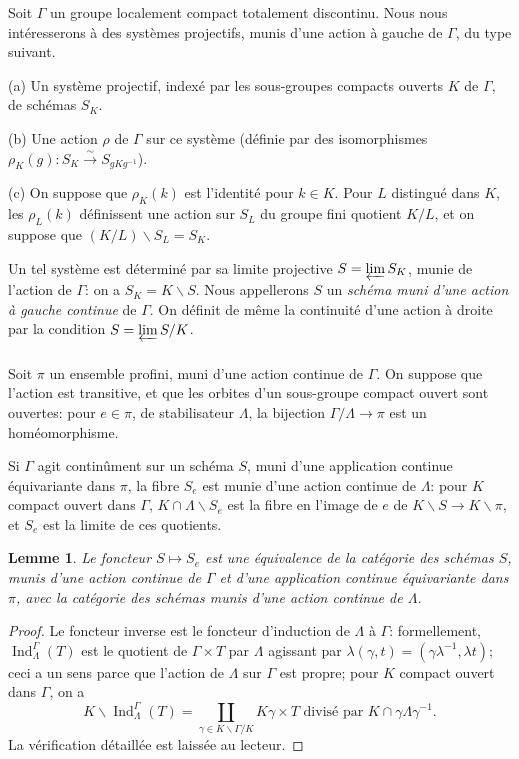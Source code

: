 \documentclass[12pt,a4paper]{article}
\theoremstyle{plain}
\newtheorem{lemma}[theorem]{Lemme}
\theoremstyle{definition}
\theoremstyle{remark}
\DeclareMathOperator{\Ind}{Ind}
\begin{document}
Soit $\Gamma$ un groupe localement compact totalement discontinu. Nous nous int\'eresserons \`a des syst\`emes projectifs, munis d'une action \`a gauche de $\Gamma$, du type suivant.

(a) Un syst\`eme projectif, index\'e par les sous-groupes compacts ouverts $K$ de $\Gamma$, de sch\'emas $S_K$.

(b) Une action $\rho$ de $\Gamma$ sur ce syst\`eme (d\'efinie par des isomorphismes $\rho_K(g): S_K \xrightarrow{\sim} S_{gKg^{-1}}$).

(c) On suppose que $\rho_K(k)$ est l'identit\'e pour $k \in K$. Pour $L$ distingu\'e dans $K$, les $\rho_L(k)$ d\'efinissent une action sur $S_L$ du groupe fini quotient $K/L$, et on suppose que $(K/L)\backslash S_L = S_K$.

Un tel syst\`eme est d\'etermin\'e par sa limite projective $S = \varprojlim S_K$, munie de l'action de $\Gamma$: on a $S_K = K\backslash S$. Nous appellerons $S$ un \textit{sch\'ema muni d'une action \`a gauche continue} de $\Gamma$. On d\'efinit de m\^eme la continuit\'e d'une action \`a droite par la condition $S = \varprojlim S/K$.

\subsubsection{}

Soit $\pi$ un ensemble profini, muni d'une action continue de $\Gamma$. On suppose que l'action est transitive, et que les orbites d'un sous-groupe compact ouvert sont ouvertes: pour $e \in \pi$, de stabilisateur $\Lambda$, la bijection $\Gamma/\Lambda \to \pi$ est un hom\'eomorphisme.

Si $\Gamma$ agit contin\^ument sur un sch\'ema $S$, muni d'une application continue \'equivariante dans $\pi$, la fibre $S_e$ est munie d'une action continue de $\Lambda$: pour $K$ compact ouvert dans $\Gamma$, $K \cap \Lambda\backslash S_e$ est la fibre en l'image de $e$ de $K\backslash S \to K\backslash\pi$, et $S_e$ est la limite de ces quotients.

\begin{lemma}
Le foncteur $S \mapsto S_e$ est une \'equivalence de la cat\'egorie des sch\'emas $S$, munis d'une action continue de $\Gamma$ et d'une application continue \'equivariante dans $\pi$, avec la cat\'egorie des sch\'emas munis d'une action continue de $\Lambda$.
\end{lemma}

\begin{proof}
Le foncteur inverse est le foncteur d'induction de $\Lambda$ \`a $\Gamma$: formellement, $\Ind_\Lambda^\Gamma(T)$ est le quotient de $\Gamma \times T$ par $\Lambda$ agissant par $\lambda(\gamma,t) = (\gamma\lambda^{-1},\lambda t)$; ceci a un sens parce que l'action de $\Lambda$ sur $\Gamma$ est propre; pour $K$ compact ouvert dans $\Gamma$, on a
\[
K\backslash\Ind_\Lambda^\Gamma(T) = \coprod_{\gamma \in K\backslash\Gamma/K} K\gamma \times T \text{ divis\'e par } K \cap \gamma\Lambda\gamma^{-1}.
\]
La v\'erification d\'etaill\'ee est laiss\'ee au lecteur.
\end{proof}
\end{document}
